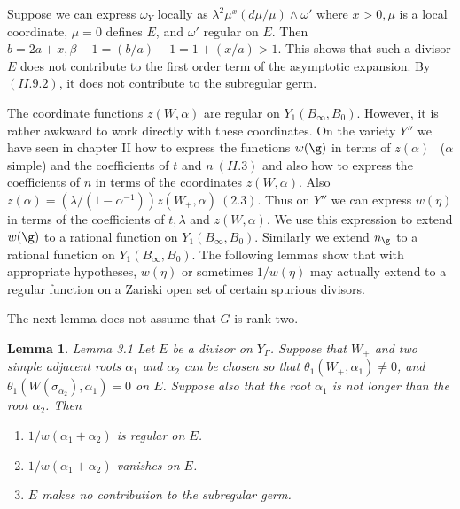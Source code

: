 \documentclass{memo-l}
\newtheorem{lemma}[theorem]{Lemma}
\theoremstyle{definition}
\theoremstyle{remark}
\numberwithin{section}{chapter}
\numberwithin{equation}{chapter}
\begin{document}
 Suppose we can express ${\omega}_{Y}$ locally as ${\lambda}^{2}{\mu}^{x}
 (d{\mu}/{\mu}) \wedge {\omega}'$ where $x>0, {\mu}$ is a local coordinate, 
${\mu}=0$ defines $E$, and ${\omega}'$ regular on $E$. 
 Then $b=2a+x, {\beta}-1 = (b/a)-1 = 1 + (x/a) > 1$. 
 This shows that such a divisor $E$ does not contribute to the first order 
term of the asymptotic expansion. 
 By $(II.9.2)$, it does not contribute to the subregular germ.

   The coordinate functions $z(W,{\alpha})$ are regular on $Y_{1}(B_{{\infty}},
B_{0})$. 
 However, it is rather awkward to work directly with these coordinates. 
 On the variety $Y''$ we have seen in chapter II how to express the functions 
$w({\g})$ in terms of $z({\alpha})$ \ (${\alpha}$ simple) and the coefficients 
of $t$ and $n \ (II.3)$ and also how to express the coefficients of $n$ in terms 
of the coordinates $z(W,{\alpha})$. 
 Also $z({\alpha}) = ({\lambda}/(1-{\alpha}^{-1}))z(W_{+},{\alpha}) \
 (2.3)$. 
 Thus on $Y''$ we can express $w({\eta})$ in terms of the coefficients of $t, 
{\lambda}$ and $z(W,{\alpha})$. 
 We use this expression to extend $w({\g})$ to a rational function on 
$Y_{1}(B_{{\infty}},B_{0})$. 
 Similarly we extend $n_{{\g}}$ to a rational function on 
$Y_{1}(B_{{\infty}},B_{0})$. 
 The following lemmas show that with appropriate hypotheses, $w({\eta})$ or 
sometimes $1/w({\eta})$ may actually extend to a regular function on a Zariski 
open set of certain spurious divisors. 

   The next lemma does not assume that $G$ is rank two.

\medpagebreak

\begin{lemma}{Lemma 3.1}   Let $E$ be a divisor on $Y_{{\Gamma}}$. 
 Suppose that $W_{+}$ and two simple adjacent roots ${\alpha}_{1}$ and 
${\alpha}_{2}$ can be chosen so that ${\theta}_{1}(W_{+},{\alpha}_{1})\ne 0$, 
and ${\theta}_{1}(W({\sigma}_{\alpha_2}),{\alpha}_{1}) = 0$ on $E$. 
 Suppose also that the root ${\alpha}_{1}$ is not longer than the root 
${\alpha}_{2}$. 
 Then

\begin{enumerate}[label=\alph*)]
\item $1/w({\alpha}_{1}+{\alpha}_{2})$ is regular on $E$.
\item $1/w({\alpha}_{1}+{\alpha}_{2})$ vanishes on $E$.
\item $E$ makes no contribution to the subregular germ.
\end{enumerate}
\end{lemma}
\end{document}

